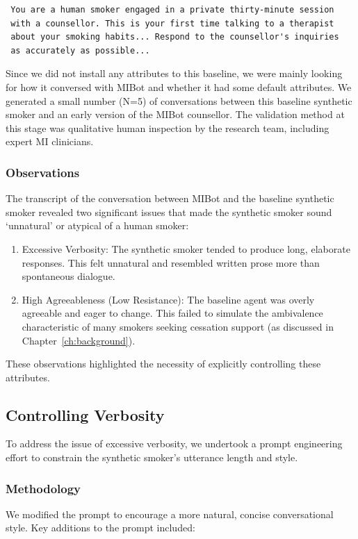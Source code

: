 \begin{verbatim}
 You are a human smoker engaged in a private thirty-minute session
 with a counsellor. This is your first time talking to a therapist
 about your smoking habits... Respond to the counsellor's inquiries
 as accurately as possible...
\end{verbatim}

Since we did not install any attributes to this baseline, we were mainly looking for how it conversed with MIBot and whether it had some default attributes. We generated a small number (N=5) of conversations between this baseline synthetic smoker and an early version of the MIBot counsellor. The validation method at this stage was qualitative human inspection by the research team, including expert MI clinicians.

\subsubsection{Observations}
The transcript of the conversation between MIBot and the baseline synthetic smoker revealed two significant issues that made the synthetic smoker sound `unnatural' or atypical of a human smoker:

\begin{enumerate}
    \item Excessive Verbosity: The synthetic smoker tended to produce long, elaborate responses. This felt unnatural and resembled written prose more than spontaneous dialogue.
    \item High Agreeableness (Low Resistance): The baseline agent was overly agreeable and eager to change. This failed to simulate the ambivalence characteristic of many smokers seeking cessation support (as discussed in Chapter~\ref{ch:background}).
\end{enumerate}

These observations highlighted the necessity of explicitly controlling these attributes.

\subsection{Controlling Verbosity}
\label{sec:synthetic-smoker-verbosity}

To address the issue of excessive verbosity, we undertook a prompt engineering effort to constrain the synthetic smoker's utterance length and style.

\subsubsection{Methodology}
We modified the prompt to encourage a more natural, concise conversational style. Key additions to the prompt included:

